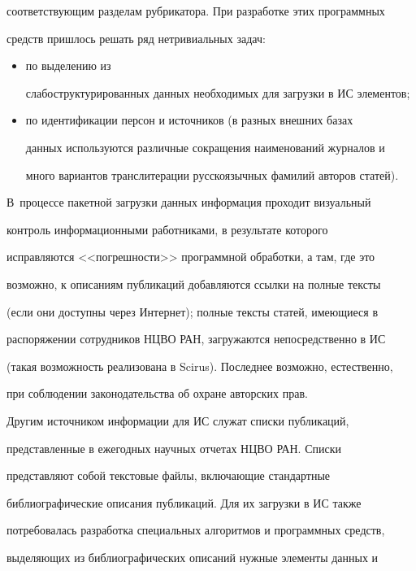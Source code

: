 соответствующим разделам рубрикатора. При разработке этих программных 


средств пришлось решать ряд нетривиальных задач:


\begin{itemize}


\item[(а)] по выделению из 


слабоструктурированных данных необходимых для загрузки в ИС элементов; 


\item[(б)] по идентификации персон и источников (в разных внешних базах 


данных используются различные сокращения наименований журналов и 


много вариантов транслитерации русскоязычных фамилий авторов статей). 


\end{itemize}





В~процессе пакетной загрузки данных информация проходит визуальный 


контроль информационными работниками, в результате которого 


исправляются <<погрешности>> программной обработки, а там, где это 


возможно, к описаниям публикаций добавляются ссылки на полные тексты 


(если они доступны через Интернет); полные тексты статей, имеющиеся в 


распоряжении сотрудников НЦВО РАН, загружаются непосредственно в ИС 


(такая возможность реализована в Scirus). Последнее возможно, естественно, 


при соблюдении законодательства об охране авторских прав.


    


    Другим источником информации для ИС служат списки публикаций, 


представленные в ежегодных научных отчетах НЦВО РАН. Списки 


представляют собой текстовые файлы, включающие стандартные 


библиографические описания публикаций. Для их загрузки в ИС также 


потребовалась разработка специальных алгоритмов и программных средств, 


выделяющих из библиографических описаний нужные элементы данных и 


